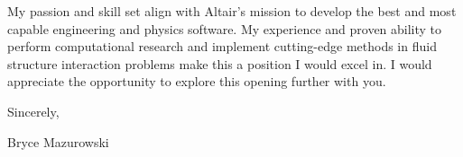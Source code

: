 \documentclass{resume}
\begin{document}
My passion and skill set align with Altair's mission to develop
the best and most capable engineering and physics software.
%
My experience and proven ability to perform computational research
and implement cutting-edge methods in fluid structure interaction
problems make this a position I would excel in.
%
I would appreciate the opportunity to explore this opening further with you.
%


Sincerely,

Bryce Mazurowski
\end{document}
